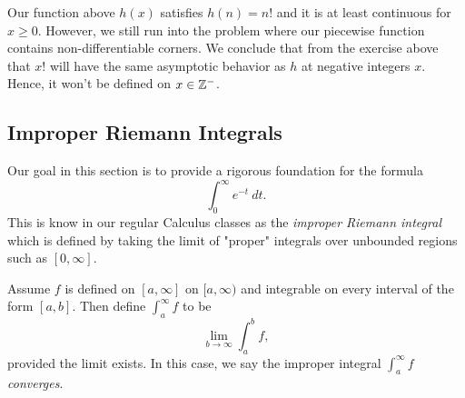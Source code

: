 Our function above \( h(x)  \) satisfies \( h(n) = n!   \) and it is at least continuous for \( x \geq 0  \). However, we still run into the problem where our piecewise function contains non-differentiable corners. We conclude that from the exercise above that \( x!  \) will have the same asymptotic behavior as \( h  \) at negative integers \( x  \). Hence, it won't be defined on \( x \in \mathbb{Z}^{-} \).

\subsection{Improper Riemann Integrals} 

Our goal in this section is to provide a rigorous foundation for the formula
\[  \int_{ 0 }^{ \infty  }  e^{-t} \ dt. \] 
This is know in our regular Calculus classes as the \textit{improper Riemann integral} which is defined by taking the limit of "proper" integrals over unbounded regions such as \( [0,\infty ] \). 

\begin{definition}{}{}
    Assume \( f  \) is defined on \( [a,\infty ] \) on \( [a, \infty  ) \) and integrable on every interval of the form \( [a,b]  \). Then define \( \int_{ a }^{ \infty  }  f  \) to be  
    \[  \lim_{ b \to \infty  }  \int_{ a }^{ b } f,  \] provided the limit exists. In this case, we say the improper integral \( \int_{ a }^{ \infty  }  f  \) \textit{converges}. 
\end{definition}

